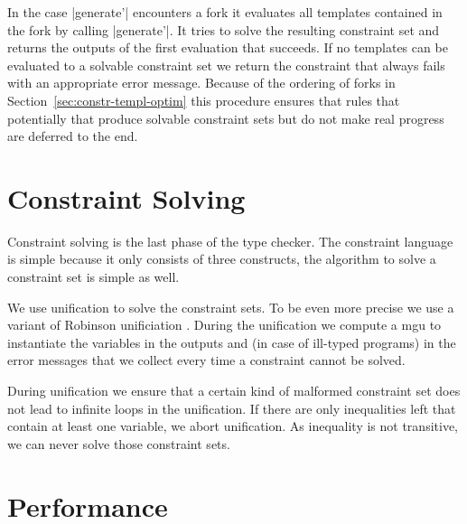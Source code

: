 In the case \code|generate'| encounters a fork it evaluates all
templates contained in the fork by calling \code|generate'|. It tries
to solve the resulting constraint set and returns the outputs of the
first evaluation that succeeds. If no templates can be evaluated to a
solvable constraint set we return the constraint that always fails
with an appropriate error message. Because of the ordering of forks in
Section~\ref{sec:constr-templ-optim} this procedure ensures that rules
that potentially that produce solvable constraint sets but do not make
real progress are deferred to the end.

\section{Constraint Solving}
\label{sec:constraint-solving}
Constraint solving is the last phase of the type checker. The
constraint language is simple because it only consists of three
constructs, the algorithm to solve a constraint set is simple as well.

We use unification to solve the constraint sets. To be even more
precise we use a variant of Robinson unificiation
. During the unification we compute a \gls{mgu} to
instantiate the variables in the outputs and (in case of ill-typed
programs) in the error messages that we collect every time a
constraint cannot be solved.

During unification we ensure that a certain kind of malformed
constraint set does not lead to infinite loops in the unification. If
there are only inequalities left that contain at least one variable,
we abort unification. As inequality is not transitive, we can never
solve those constraint sets.
\section{Performance}
\label{sec:performance}

